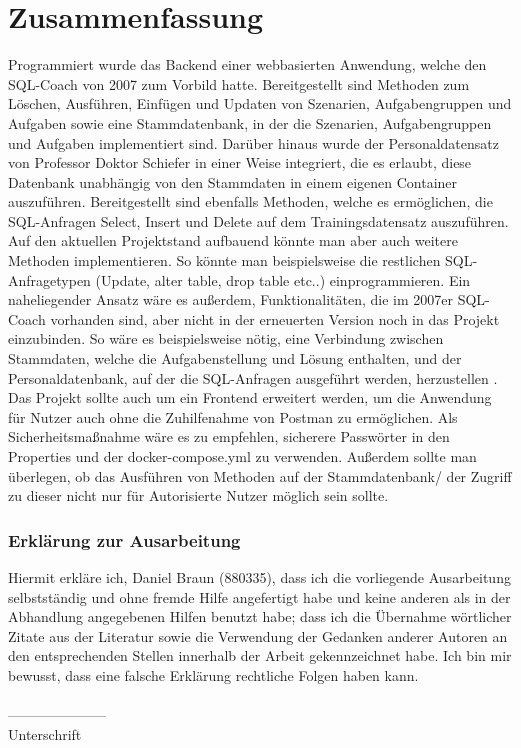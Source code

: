 \documentclass[fleqn,10pt,ngerman]{SelfArx}
\begin{document}
		\section{Zusammenfassung}
	Programmiert wurde das Backend einer webbasierten Anwendung, welche den SQL-Coach von 2007 zum Vorbild hatte. Bereitgestellt sind Methoden zum Löschen, Ausführen, Einfügen und Updaten von Szenarien, Aufgabengruppen und Aufgaben sowie eine Stammdatenbank, in der die Szenarien, Aufgabengruppen und Aufgaben implementiert sind. 
	Darüber hinaus wurde der Personaldatensatz von Professor Doktor Schiefer in einer Weise  integriert, die es erlaubt, diese Datenbank unabhängig von den Stammdaten in einem eigenen Container auszuführen. Bereitgestellt sind ebenfalls Methoden, welche es ermöglichen, die SQL-Anfragen Select, Insert und Delete auf dem Trainingsdatensatz auszuführen.
	Auf den aktuellen Projektstand aufbauend könnte man aber auch weitere Methoden implementieren. So könnte man beispielsweise die restlichen SQL-Anfragetypen (Update, alter table, drop table etc..) einprogrammieren. Ein naheliegender Ansatz wäre es außerdem, Funktionalitäten, die im 2007er SQL-Coach vorhanden sind, aber nicht in der erneuerten Version noch in das Projekt einzubinden. So wäre es beispielsweise nötig, eine Verbindung zwischen Stammdaten, welche die Aufgabenstellung und Lösung enthalten, und der Personaldatenbank, auf der die SQL-Anfragen ausgeführt werden, herzustellen .
	Das Projekt sollte auch um ein Frontend erweitert werden, um die Anwendung für Nutzer auch ohne die Zuhilfenahme von Postman zu ermöglichen.
	Als Sicherheitsmaßnahme wäre es zu empfehlen, sicherere Passwörter in den Properties und der docker-compose.yml zu verwenden. Außerdem sollte man überlegen, ob das Ausführen von Methoden auf der Stammdatenbank/ der Zugriff zu dieser nicht nur für Autorisierte Nutzer möglich sein sollte.
	
	
	
	
	
	
	
	
	
	
	


	\subsubsection*{Erklärung zur Ausarbeitung}
	Hiermit erkläre ich, Daniel Braun (880335), dass ich die vorliegende Ausarbeitung selbstständig und ohne fremde Hilfe angefertigt habe und keine anderen als in der Abhandlung angegebenen Hilfen benutzt habe; dass ich die Übernahme wörtlicher Zitate aus der Literatur sowie die Verwendung der Gedanken anderer Autoren an den entsprechenden Stellen innerhalb der Arbeit gekennzeichnet habe. Ich bin mir bewusst, dass eine falsche Erklärung rechtliche Folgen haben kann.\\ \\
	--------------------- \\
	Unterschrift
\end{document}
